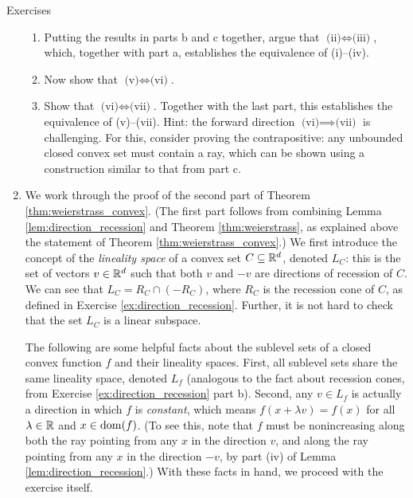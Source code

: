 \begin{xcb}{Exercises}
\begin{enumerate}[label=\thechapter.\arabic*]
\begin{enumerate}[label=\alph*.]
\item Putting the results in parts b and c together, argue that $\text{(ii)}
  \iff \text{(iii)}$, which, together with part a, establishes the equivalence
  of (i)--(iv).   

\item Now show that $\text{(v)} \iff \text{(vi)}$. 

\item Show that $\text{(vi)} \iff \text{(vii)}$. Together with the last part, 
  this establishes the equivalence of (v)--(vii). Hint: the forward direction
  $\text{(vi)} \implies \text{(vii)}$ is challenging. For this, consider proving
  the contrapositive: any unbounded closed convex set must contain a ray, which
  can be shown using a construction similar to that from part c. 
\end{enumerate}

\item \label{ex:direction_constancy}
  We work through the proof of the second part of Theorem
  \ref{thm:weierstrass_convex}. (The first part follows from combining Lemma
  \ref{lem:direction_recession} and Theorem \ref{thm:weierstrass}, as explained
  above the statement of Theorem \ref{thm:weierstrass_convex}.) We first
  introduce the concept of the \emph{lineality space} of a convex set $C
  \subseteq \mathbb{R}^d$, denoted $L_C$: this is the set of vectors $v \in \mathbb{R}^d$ such
  that both $v$ and $-v$ are directions of recession of $C$. We can see that
  $L_C = R_C \cap (-R_C)$, where $R_C$ is the recession cone of $C$, as defined
  in Exercise \ref{ex:direction_recession}. Further, it is not hard to check
  that the set $L_C$ is a linear subspace. 

  The following are some helpful facts about the sublevel sets of a closed
  convex function $f$ and their lineality spaces. First, all sublevel sets share
  the same lineality space, denoted $L_f$ (analogous to the fact about recession
  cones, from Exercise \ref{ex:direction_recession} part b). Second, any $v \in 
  L_f$ is actually a direction in which $f$ is \emph{constant}, which means $f(x
  + \lambda v) = f(x)$ for all $\lambda \in \mathbb{R}$ and $x \in \operatorname{dom}(f)$. (To see
  this, note that $f$ must be nonincreasing along both the ray pointing from 
  any $x$ in the direction $v$, and along the ray pointing from any $x$ in the 
  direction $-v$, by part (iv) of Lemma \ref{lem:direction_recession}.)  With
  these facts in hand, we proceed with the exercise itself.


\end{enumerate}
\end{xcb}
